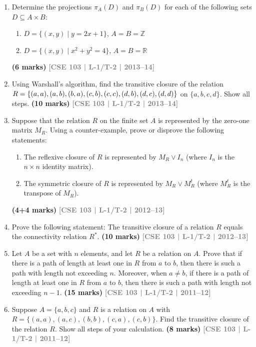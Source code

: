 \documentclass[12pt,a3paper]{article}
\newcommand{\yr}[1]{\hfill\textcolor{gray}{\small\textbf{[#1]}}}
\newcommand{\mk}[1]{\textcolor{orange!70!black}{\small\textbf{(#1 marks)}}}
\begin{document}
\begin{enumerate}
\item Determine the projections $\pi_A(D)$ and $\pi_B(D)$ for each of the following sets $D \subseteq A \times B$:
\begin{enumerate}
  \item $D = \{(x,y) \mid y = 2x+1\}$, $A = B = \mathbb{Z}$
  \item $D = \{(x,y) \mid x^2 + y^2 = 4\}$, $A = B = \mathbb{R}$
\end{enumerate}
\mk{6} \yr{CSE 103 | L-1/T-2 | 2013--14}

\item Using Warshall's algorithm, find the transitive closure of the relation $R = \{(a,a),(a,b)\\,(b,a),(c,b),(c,c),(d,b),(d,c),(d,d)\}$ on $\{a, b, c, d\}$. Show all steps.
\mk{10} \yr{CSE 103 | L-1/T-2 | 2013--14}


\item Suppose that the relation $R$ on the finite set $A$ is represented by the zero-one matrix $M_R$. Using a counter-example, prove or disprove the following statements:
\begin{enumerate}
  \item The reflexive closure of $R$ is represented by $M_R \lor I_n$ (where $I_n$ is the $n \times n$ identity matrix).
  \item The symmetric closure of $R$ is represented by $M_R \lor M_R^t$ (where $M_R^t$ is the transpose of $M_R$).
\end{enumerate}
\mk{4+4} \yr{CSE 103 | L-1/T-2 | 2012--13}

\item Prove the following statement: The transitive closure of a relation $R$ equals the connectivity relation $R^*$.
\mk{10} \yr{CSE 103 | L-1/T-2 | 2012--13}

\item Let $A$ be a set with $n$ elements, and let $R$ be a relation on $A$. Prove that if there is a path of length at least one in $R$ from $a$ to $b$, then there is such a path with length not exceeding $n$. Moreover, when $a \neq b$, if there is a path of length at least one in $R$ from $a$ to $b$, then there is such a path with length not exceeding $n - 1$.
\mk{15} \yr{CSE 103 | L-1/T-2 | 2011--12}

\item Suppose $A = \{a, b, c\}$ and $R$ is a relation on $A$ with $R = \{(a,a), (a,c), (b,b), (c,a), (c,b)\}$. Find the transitive closure of the relation $R$. Show all steps of your calculation.
\mk{8} \yr{CSE 103 | L-1/T-2 | 2011--12}


\end{enumerate}
\end{document}

